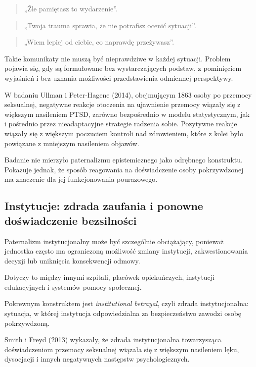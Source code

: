\documentclass[11pt,a4paper,oneside,headinclude=true,footinclude=false]{scrartcl}
\begin{document}
\begin{quote}
„Źle pamiętasz to wydarzenie''.
\end{quote}

\begin{quote}
„Twoja trauma sprawia, że nie potrafisz ocenić sytuacji''.
\end{quote}

\begin{quote}
„Wiem lepiej od ciebie, co naprawdę przeżywasz''.
\end{quote}

Takie komunikaty nie muszą być nieprawdziwe w każdej sytuacji. Problem
pojawia się, gdy są formułowane bez wystarczających podstaw, z
pominięciem wyjaśnień i bez uznania możliwości przedstawienia odmiennej
perspektywy.

W badaniu Ullman i Peter-Hagene (2014), obejmującym 1863 osoby po
przemocy seksualnej, negatywne reakcje otoczenia na ujawnienie przemocy
wiązały się z większym nasileniem PTSD, zarówno bezpośrednio w modelu
statystycznym, jak i pośrednio przez nieadaptacyjne strategie radzenia
sobie. Pozytywne reakcje wiązały się z większym poczuciem kontroli nad
zdrowieniem, które z kolei było powiązane z mniejszym nasileniem
objawów.

Badanie nie mierzyło paternalizmu epistemicznego jako odrębnego
konstruktu. Pokazuje jednak, że sposób reagowania na doświadczenie osoby
pokrzywdzonej ma znaczenie dla jej funkcjonowania pourazowego.

\subsection{Instytucje: zdrada zaufania i ponowne doświadczenie bezsilności}\label{subsec:4.4}

Paternalizm instytucjonalny może być szczególnie obciążający, ponieważ
jednostka często ma ograniczoną możliwość zmiany instytucji,
zakwestionowania decyzji lub uniknięcia konsekwencji odmowy.

Dotyczy to między innymi szpitali, placówek opiekuńczych, instytucji
edukacyjnych i systemów pomocy społecznej.

Pokrewnym konstruktem jest \emph{institutional betrayal}, czyli zdrada
instytucjonalna: sytuacja, w której instytucja odpowiedzialna za
bezpieczeństwo zawodzi osobę pokrzywdzoną.

Smith i Freyd (2013) wykazały, że zdrada instytucjonalna towarzysząca
doświadczeniom przemocy seksualnej wiązała się z większym nasileniem
lęku, dysocjacji i innych negatywnych następstw psychologicznych.
\end{document}
